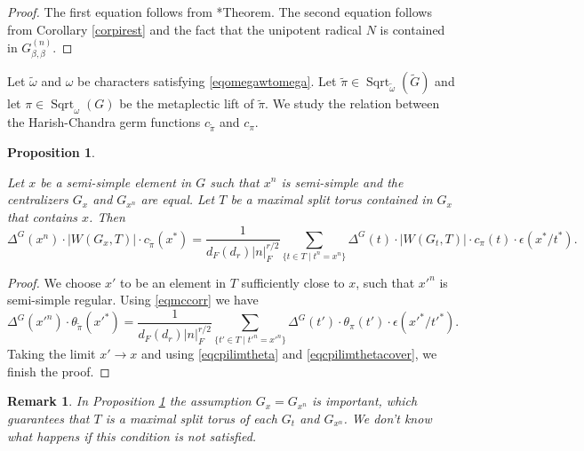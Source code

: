 \documentclass{amsart}
\numberwithin{equation}{section}
\newtheorem{proposition}[theorem]{\bf{Proposition}}
\newtheorem{remark}[theorem]{\bf{Remark}}
\newcommand{\abs}[1]{\left|#1\right|_{F}}
\newcommand{\car}[1]{\left|#1\right|}
\newcommand{\mrsqrt}{\operatorname{Sqrt}}
\newcommand{\dF}[1]{d_{F}(#1)}
\newcommand{\wt}[1]{\widetilde{#1}}
\begin{document}
	\begin{proof}
		
		The first equation follows from \cite{banks1998heredity}*{Theorem}. The second equation follows from Corollary \ref{corpirest} and the fact that the unipotent radical $N$ is contained in $G_{\beta,\beta}^{(n)}$.
		
	\end{proof}
	
	Let $\wt{\omega}$ and $\omega$ be characters satisfying \eqref{eqomegawtomega}. Let $\wt{\pi}\in\mrsqrt_{\wt{\omega}}(\wt{G})$ and let $\pi\in\mrsqrt_{\omega}(G)$ be the metaplectic lift of $\wt{\pi}$. We study the relation between the Harish-Chandra germ functions $c_{\wt{\pi}}$ and $c_{\pi}$.
	
	\begin{proposition}\label{propcwtpicpi}
		
		Let $x$ be a semi-simple element in $G$ such that $x^{n}$ is semi-simple and the centralizers $G_{x}$ and $G_{x^{n}}$ are equal. Let $T$ be a maximal split torus contained in $G_{x}$ that contains $x$. Then
		$$\Delta^{G}(x^{n})\cdot\car{W(G_{x},T)}\cdot c_{\wt{\pi}}(x^{*})=\frac{1}{\dF{d_{r}}\abs{n}^{r/2}}\sum_{\{t\in T\mid t^{n}=x^{n}\}}\Delta^{G}(t)\cdot\car{W(G_{t},T)}\cdot c_{\pi}(t)\cdot\epsilon(x^{*}/t^{*}).$$
		
	\end{proposition}
	
	\begin{proof}
		
		We choose $x'$ to be an element in $T$ sufficiently close to $x$, such that $x'^{n}$ is semi-simple regular. Using \eqref{eqmccorr} we have
		$$\Delta^{G}(x'^{n})\cdot \theta_{\wt{\pi}}(x'^{*})=\frac{1}{\dF{d_{r}}\abs{n}^{r/2}}\sum_{\{t'\in T\mid t'^{n}=x'^{n}\}}\Delta^{G}(t')\cdot \theta_{\pi}(t')\cdot\epsilon(x'^{*}/t'^{*}).$$
		Taking the limit $x'\rightarrow x$ and using \eqref{eqcpilimtheta} and \eqref{eqcpilimthetacover}, we finish the proof.
		
	\end{proof}
	
	\begin{remark}
		
		In Proposition \ref{propcwtpicpi} the assumption $G_{x}=G_{x^{n}}$ is important, which guarantees that $T$ is a maximal split torus of each $G_{t}$ and $G_{x^{n}}$. We don't know what happens if this condition is not satisfied.
		
	\end{remark}
	
\end{document}
